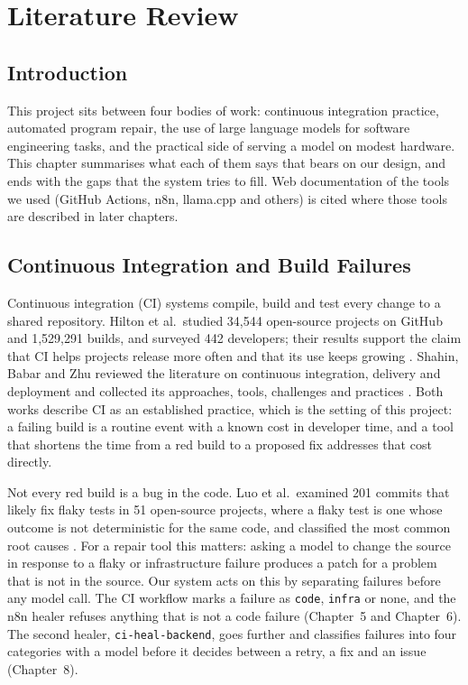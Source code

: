 \chapter{Literature Review}

\section{Introduction}
This project sits between four bodies of work: continuous integration practice, automated program repair, the use of large language models for software engineering tasks, and the practical side of serving a model on modest hardware. This chapter summarises what each of them says that bears on our design, and ends with the gaps that the system tries to fill. Web documentation of the tools we used (GitHub Actions, n8n, llama.cpp and others) is cited where those tools are described in later chapters.

\section{Continuous Integration and Build Failures}
Continuous integration (CI) systems compile, build and test every change to a shared repository. Hilton et al.\ studied 34,544 open-source projects on GitHub and 1,529,291 builds, and surveyed 442 developers; their results support the claim that CI helps projects release more often and that its use keeps growing \cite{hilton16}. Shahin, Babar and Zhu reviewed the literature on continuous integration, delivery and deployment and collected its approaches, tools, challenges and practices \cite{shahin17}. Both works describe CI as an established practice, which is the setting of this project: a failing build is a routine event with a known cost in developer time, and a tool that shortens the time from a red build to a proposed fix addresses that cost directly.

Not every red build is a bug in the code. Luo et al.\ examined 201 commits that likely fix flaky tests in 51 open-source projects, where a flaky test is one whose outcome is not deterministic for the same code, and classified the most common root causes \cite{luo14}. For a repair tool this matters: asking a model to change the source in response to a flaky or infrastructure failure produces a patch for a problem that is not in the source. Our system acts on this by separating failures before any model call. The CI workflow marks a failure as \texttt{code}, \texttt{infra} or none, and the n8n healer refuses anything that is not a code failure (Chapter~5 and Chapter~6). The second healer, \texttt{ci-heal-backend}, goes further and classifies failures into four categories with a model before it decides between a retry, a fix and an issue (Chapter~8).


